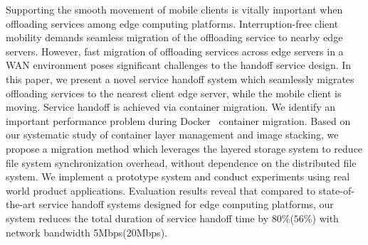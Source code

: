 
Supporting the smooth movement of mobile clients is vitally important when offloading services among edge computing platforms. Interruption-free client mobility demands seamless migration of the offloading service to nearby edge servers.
% 
However, fast migration of offloading services across edge servers in a WAN environment poses significant challenges to the handoff service design. 
%
%
%
In this paper, we present a novel service handoff system which seamlessly migrates offloading services to the nearest client edge server, while the mobile client is moving. 
Service handoff is achieved via container migration. 
% 
We identify an important performance problem during Docker~\cite{docker} container migration.
%
Based on our systematic study of container layer management and image stacking,
we propose a migration method which leverages the layered storage system to reduce file system synchronization overhead, without dependence on the distributed file system. 
We implement a prototype system and conduct experiments using real world product applications.
Evaluation results reveal that compared to state-of-the-art service handoff systems designed for edge computing platforms, our system reduces the total duration of service handoff time by 
$80\%$($56\%$) with network bandwidth 5Mbps(20Mbps).







%
%
%

